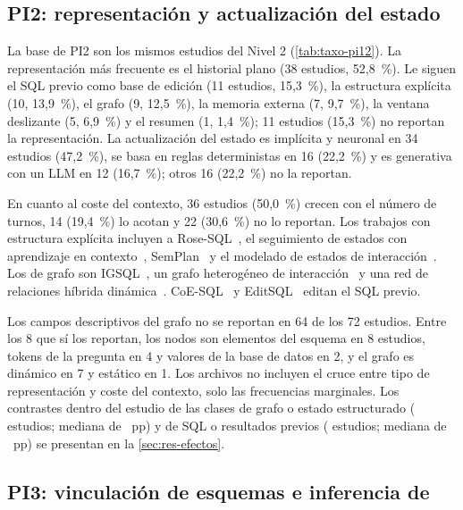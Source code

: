 \subsection{PI2: representación y actualización del estado}
\label{sec:res-pi2}

La base de PI2 son los mismos \nUmbral{} estudios del Nivel 2 (\cref{tab:taxo-pi12}). La representación más frecuente es el historial plano (38 estudios, 52,8~\%). Le siguen el SQL previo como base de edición (11 estudios, 15,3~\%), la estructura explícita (10, 13,9~\%), el grafo (9, 12,5~\%), la memoria externa (7, 9,7~\%), la ventana deslizante (5, 6,9~\%) y el resumen (1, 1,4~\%); 11 estudios (15,3~\%) no reportan la representación. La actualización del estado es implícita y neuronal en 34 estudios (47,2~\%), se basa en reglas deterministas en 16 (22,2~\%) y es generativa con un LLM en 12 (16,7~\%); otros 16 (22,2~\%) no la reportan.

En cuanto al coste del contexto, 36 estudios (50,0~\%) crecen con el número de turnos, 14 (19,4~\%) lo acotan y 22 (30,6~\%) no lo reportan. Los trabajos con estructura explícita incluyen a Rose-SQL~\cite{Zhou2026RoseSQL}, el seguimiento de estados con aprendizaje en contexto~\cite{Hu2022InContext}, SemPlan~\cite{Teixeira2026SemPlan} y el modelado de estados de interacción~\cite{Wang2021Tracking}. Los de grafo son IGSQL~\cite{Cai2020IGSQL}, un grafo heterogéneo de interacción~\cite{Yu2021Interactionmodeling} y una red de relaciones híbrida dinámica~\cite{Hui2021Dynamic}. CoE-SQL~\cite{Zhang2024CoESQL} y EditSQL~\cite{Zhang2019EditSQL} editan el SQL previo.

Los campos descriptivos del grafo no se reportan en 64 de los 72 estudios. Entre los 8 que sí los reportan, los nodos son elementos del esquema en 8 estudios, tokens de la pregunta en 4 y valores de la base de datos en 2, y el grafo es dinámico en 7 y estático en 1. Los archivos no incluyen el cruce entre tipo de representación y coste del contexto, solo las frecuencias marginales. Los contrastes dentro del estudio de las clases de grafo o estado estructurado (\efGrafoN{} estudios; mediana de \efGrafoMed{}~pp) y de SQL o resultados previos (\efSQLPrevN{} estudios; mediana de \efSQLPrevMed{}~pp) se presentan en la \cref{sec:res-efectos}.

\subsection{PI3: vinculación de esquemas e inferencia de }
\label{sec:res-pi3}


